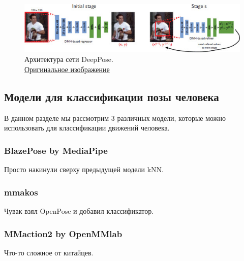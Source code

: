 \begin{figure}[h]
	\centering
	\includegraphics[width=\textwidth]{./images/DeepPose}
	\caption{Архитектура сети DeepPose.\\ \href{https://ieeexplore.ieee.org/mediastore_new/IEEE/content/media/6909096/6909393/6909610/6909610-fig-2-source-small.gif}{Оригинальное изображение}}
	\label{fig:dp_architecture}
\end{figure}





\subsection{Модели для классификации позы человека}

В данном разделе мы рассмотрим 3 различных модели, которые можно использовать для классификации движений человека. 


\subsubsection{BlazePose by MediaPipe}

Просто накинули сверху предыдущей модели kNN.

\subsubsection{mmakos}

Чувак взял OpenPose и добавил классификатор.

\subsubsection{MMaction2 by OpenMMlab}

Что-то сложное от китайцев.


\newpage